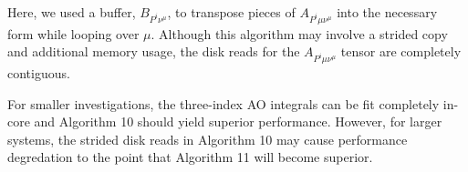 \noindent Here, we used a buffer, $B_{P^i \nu^{\mu}}$, to transpose pieces of $A_{P^i \mu \nu^{\mu}}$ into the necessary form
while looping over $\mu$.
Although this algorithm may involve a strided copy and additional memory usage, the disk reads for the $A_{P^i \mu \nu^{\mu}}$ 
tensor are completely contiguous.  

For smaller investigations, the three-index AO integrals can be fit completely in-core and Algorithm 10 should yield superior 
performance. However, for larger systems,
the strided disk reads in Algorithm 10 may cause performance degredation to the point that Algorithm 11 will become superior.

 
